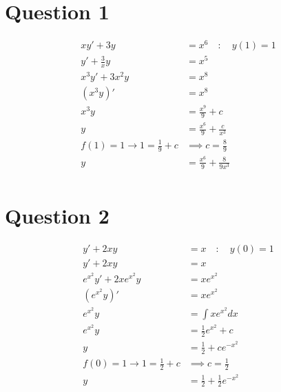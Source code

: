 \documentclass{article}
\begin{document}
\newcommand{\documentcourse}{MATH1851}
\newcommand{\documentnumber}{4}





\section*{Question 1}
\begin{align*}
    xy'+3y                    & =x^6\quad:\quad y(1)=1          \\
    y'+\frac{3}{x}y           & =x^5                            \\
    x^3y' + 3x^2y             & =x^8                            \\
    (x^3y)'                   & =x^8                            \\
    x^3y                      & =\frac{x^9}{9} + c              \\
    y                         & =\frac{x^6}{9} + \frac{c}{x^3}  \\
    f(1)=1\to 1=\frac{1}{9}+c & \implies c=\frac{8}{9}          \\
    y                         & =\frac{x^6}{9} + \frac{8}{9x^3} \\
\end{align*}

\section*{Question 2}
\begin{align*}
    y'+2xy                    & =x\quad:\quad y(0)=1             \\
    y'+2xy                    & =x                               \\
    e^{x^2}y'+2xe^{x^2}y      & =xe^{x^2}                        \\
    (e^{x^2}y)'               & =xe^{x^2}                        \\
    e^{x^2}y                  & =\int xe^{x^2}dx                 \\
    e^{x^2}y                  & =\frac{1}{2}e^{x^2}+c            \\
    y                         & =\frac{1}{2}+ce^{-x^2}           \\
    f(0)=1\to 1=\frac{1}{2}+c & \implies c=\frac{1}{2}           \\
    y                         & =\frac{1}{2}+\frac{1}{2}e^{-x^2} \\
\end{align*}
\end{document}

